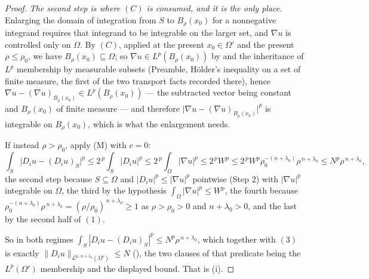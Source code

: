 \begin{proof}
\emph{The second step is where $(C)$ is consumed, and it is the only place.}
Enlarging the domain of integration from $S$ to $B_\rho(x_0)$ for a nonnegative
integrand requires that integrand to be integrable on the larger set, and
$\nabla u$ is controlled only on $\Omega$.  By $(C)$, applied at the present
$x_0\in\Omega'$ and the present $\rho\le\rho_0$, we have
$B_\rho(x_0)\subseteq\Omega$; so $\nabla u\in L^p(B_\rho(x_0))$ by
 and the inheritance of $L^p$ membership by measurable
subsets (Preamble, H\"older's inequality on a set of finite measure, the first
of the two transport facts recorded there), hence
$\nabla u-(\nabla u)_{B_\rho(x_0)}\in L^p(B_\rho(x_0))$ --- the subtracted
vector being constant and $B_\rho(x_0)$ of finite measure --- and therefore
$\bigl|\nabla u-(\nabla u)_{B_\rho(x_0)}\bigr|^p$ is integrable on
$B_\rho(x_0)$, which is what the enlargement needs.

If instead $\rho>\rho_0$, apply (M) with $c=0$:
\[
\int_S\bigl|D_iu-(D_iu)_S\bigr|^p\le2^{\,p}\!\int_S|D_iu|^p
\le2^{\,p}\!\int_\Omega|\nabla u|^p\le2^{\,p}W^p
\le2^{\,p}W^p\rho_0^{-(n+\lambda_0)}\rho^{\,n+\lambda_0}
\le N^p\rho^{\,n+\lambda_0},
\]
the second step because $S\subseteq\Omega$ and $|D_iu|^p\le|\nabla u|^p$
pointwise (Step 2) with $|\nabla u|^p$ integrable on $\Omega$, the third by the
hypothesis $\int_\Omega|\nabla u|^p\le W^p$, the fourth because
$\rho_0^{-(n+\lambda_0)}\rho^{\,n+\lambda_0}=(\rho/\rho_0)^{\,n+\lambda_0}\ge1$
as $\rho>\rho_0>0$ and $n+\lambda_0>0$, and the last by the second half of
$(1)$.

So in both regimes
$\int_S|D_iu-(D_iu)_S|^p\le N^p\rho^{\,n+\lambda_0}$, which together with
$(3)$ is exactly
$\|D_iu\|_{\mathcal L^{p,\,n+\lambda_0}(\Omega')}\le N$
(), the two clauses of that predicate being the
$L^p(\Omega')$ membership and the displayed bound.  That is (i).


\end{proof}
